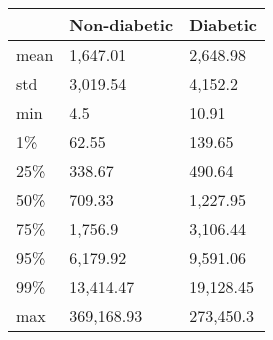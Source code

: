 \begin{tabular}{lll}
\toprule
{} & Non-diabetic &   Diabetic \\
\midrule
mean &     1,647.01 &   2,648.98 \\
std  &     3,019.54 &    4,152.2 \\
min  &          4.5 &      10.91 \\
1\%   &        62.55 &     139.65 \\
25\%  &       338.67 &     490.64 \\
50\%  &       709.33 &   1,227.95 \\
75\%  &      1,756.9 &   3,106.44 \\
95\%  &     6,179.92 &   9,591.06 \\
99\%  &    13,414.47 &  19,128.45 \\
max  &   369,168.93 &  273,450.3 \\
\bottomrule
\end{tabular}
